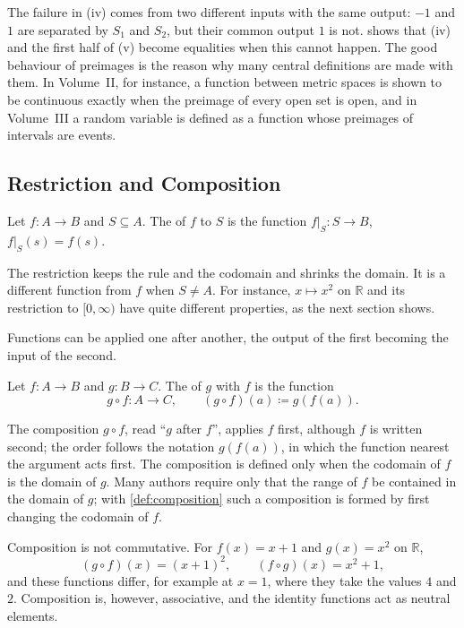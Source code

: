 The failure in (iv) comes from two different inputs with the same output: $-1$ and $1$ are separated by $S_1$ and $S_2$, but their common output $1$ is not.  shows that (iv) and the first half of (v) become equalities when this cannot happen. The good behaviour of preimages is the reason why many central definitions are made with them. In Volume~II, for instance, a function between metric spaces is shown to be continuous exactly when the preimage of every open set is open, and in Volume~III a random variable is defined as a function whose preimages of intervals are events.

\subsection{Restriction and Composition}

\begin{definition}[Restriction]
\label{def:restriction}
Let $f\colon A\to B$ and $S\subseteq A$. The  of $f$ to $S$ is the function $f|_S\colon S\to B$, $f|_S(s)=f(s)$.
\end{definition}

The restriction keeps the rule and the codomain and shrinks the domain. It is a different function from $f$ when $S\ne A$. For instance, $x\mapsto x^2$ on $\mathbb R$ and its restriction to $[0,\infty)$ have quite different properties, as the next section shows.

Functions can be applied one after another, the output of the first becoming the input of the second.

\begin{definition}[Composition]
\label{def:composition}
Let $f\colon A\to B$ and $g\colon B\to C$. The  of $g$ with $f$ is the function
\[
g\circ f\colon A\to C,\qquad(g\circ f)(a)\coloneqq g(f(a)).
\]
\end{definition}

The composition $g\circ f$, read ``$g$ after $f$'', applies $f$ first, although $f$ is written second; the order follows the notation $g(f(a))$, in which the function nearest the argument acts first. The composition is defined only when the codomain of $f$ is the domain of $g$. Many authors require only that the range of $f$ be contained in the domain of $g$; with \cref{def:composition} such a composition is formed by first changing the codomain of $f$.

Composition is not commutative. For $f(x)=x+1$ and $g(x)=x^2$ on $\mathbb R$,
\[
(g\circ f)(x)=(x+1)^2,\qquad(f\circ g)(x)=x^2+1,
\]
and these functions differ, for example at $x=1$, where they take the values $4$ and $2$. Composition is, however, associative, and the identity functions act as neutral elements.

